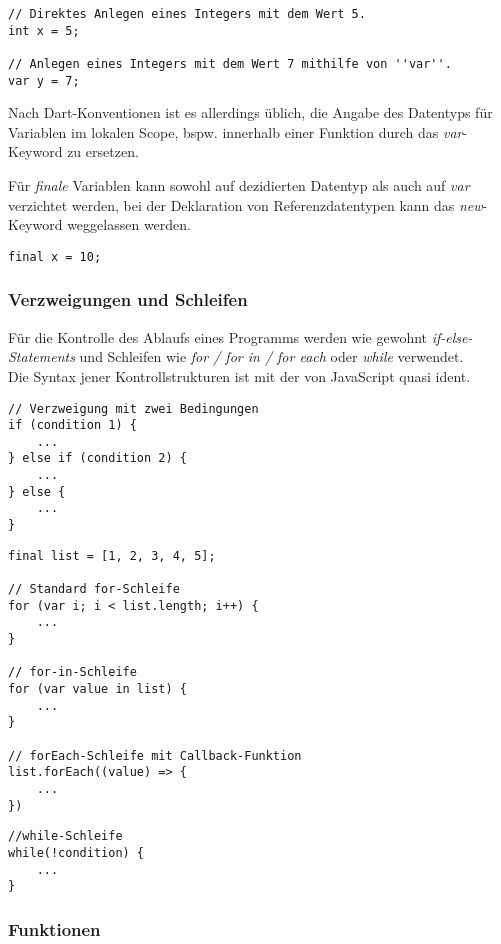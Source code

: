 \begin{lstlisting}
// Direktes Anlegen eines Integers mit dem Wert 5.
int x = 5;

// Anlegen eines Integers mit dem Wert 7 mithilfe von ''var''.
var y = 7;
\end{lstlisting}

Nach Dart-Konventionen ist es allerdings üblich, die Angabe des Datentyps für Variablen 
im lokalen Scope, bspw. innerhalb einer Funktion durch das \textit{var}-Keyword zu ersetzen.

Für \textit{finale} Variablen kann sowohl auf dezidierten Datentyp als auch auf \textit{var} 
verzichtet werden, bei der Deklaration von Referenzdatentypen kann das \textit{new}-Keyword 
weggelassen werden.

\begin{lstlisting}
final x = 10;
\end{lstlisting}

\subsubsection{Verzweigungen und Schleifen}

Für die Kontrolle des Ablaufs eines Programms werden wie gewohnt \textit{if-else-Statements} und Schleifen
wie \textit{for / for in / for each} oder \textit{while} verwendet.\\
Die Syntax jener Kontrollstrukturen ist mit der von JavaScript quasi ident.

\begin{lstlisting}
// Verzweigung mit zwei Bedingungen
if (condition 1) {
    ...
} else if (condition 2) {
    ...
} else {
    ...
}
\end{lstlisting}

\begin{lstlisting}
final list = [1, 2, 3, 4, 5];

// Standard for-Schleife
for (var i; i < list.length; i++) {
    ...
}

// for-in-Schleife
for (var value in list) {
    ...
}

// forEach-Schleife mit Callback-Funktion
list.forEach((value) => {
    ...
})
\end{lstlisting}

\begin{lstlisting}
//while-Schleife
while(!condition) {
    ...
}
\end{lstlisting}

\subsubsection{Funktionen}


